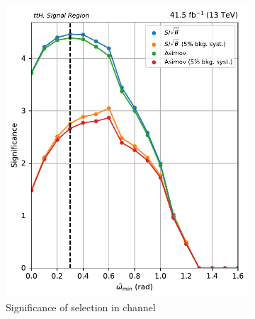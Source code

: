 \begin{figure}[htbp]
    \begin{subfigure}[b]{0.47\textwidth}
        \includegraphics[width=\textwidth]{figures/category_optimisations/with_mindphi_cut/significance_ttH_min_omega_tilde_all.pdf}
        \caption{Significance of selection in \ttH channel}
    \end{subfigure}
    \hfill
    \begin{subfigure}[b]{0.47\textwidth}

\end{subfigure}
\end{figure}

